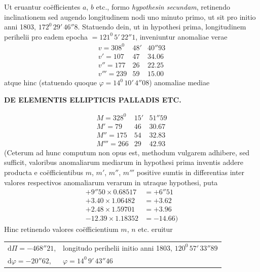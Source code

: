 Ut eruantur coëfficientes $a$, $b$ etc., formo \textit{hypothesin secundam}, retinendo inclinationem sed augendo longitudinem nodi uno minuto primo, ut sit pro initio anni 1803, $172^0\,29'\,46''8$. Statuendo dein, ut in hypothesi prima, longitudinem perihelii pro eadem epocha $=121^0\,5'\,22''1$, inveniuntur anomaliae verae
\[
\begin{array}{rrr}
v=308^0&48'&40''93\\
v'=107&47&34.06\\
v''=177&26&22.25\\
v'''=239&59&15.00
\end{array}
\]
atque hinc (statuendo quoque $\varphi=14^0\,10'\,4''08$) anomaliae mediae
\par\clearpage
\thispagestyle{empty}
\noindent{}%
\makebox[12mm][l]{}%
\parbox[t]{\dimexpr\linewidth-24mm\relax}{\centering\footnotesize\bfseries DE ELEMENTIS ELLIPTICIS PALLADIS ETC.\par}%
\par\nobreak\medskip
\[
\begin{array}{rrr}
M=328^0&15'&51''59\\
M'=79&46&30.67\\
M''=175&54&32.83\\
M'''=266&29&42.93
\end{array}
\]
(Ceterum ad hunc computum non opus est, methodum vulgarem adhibere, sed sufficit, valoribus anomaliarum mediarum in hypothesi prima inventis addere producta e coëfficientibus $m$, $m'$, $m''$, $m'''$ positive sumtis in differentias inter valores respectivos anomaliarum verarum in utraque hypothesi, puta
\[
\begin{aligned}
+9''50\times0.68517&=+6''51\\
+3.40\times1.06482&=+3.62\\
+2.48\times1.59701&=+3.96\\
-12.39\times1.18352&=-14.66)
\end{aligned}
\]
Hinc retinendo valores coëfficientium $m$, $n$ etc. eruitur
\par\nobreak\smallskip
\noindent\hspace*{.06\linewidth}%
{\fontsize{9}{11}\selectfont\begin{tabular}[t]{@{}p{.20\linewidth}@{\enspace}p{.70\linewidth}@{}}
$\mathrm d\Pi=-468''21$,&longitudo perihelii initio anni 1803, $120^0\,57'\,33''89$\\
$\mathrm d\varphi=-20''62$,&\hspace*{.30\linewidth}$\varphi=14^0\,9'\,43''46$
\end{tabular}}\par\nobreak\smallskip
